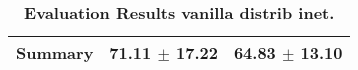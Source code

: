 \begin{table}[htb]
{\begin{tabular}{lll}
\midrule
\textbf{Summary                                  } &                  \phantom{0}71.11 $\pm$ 17.22 &                      \phantom{0}64.83 $\pm$ 13.10 \\
\bottomrule
\end{tabular}%
}
\caption{\textbf{Evaluation Results vanilla distrib inet.}}
\label{tab:eval-results}
\end{table}
